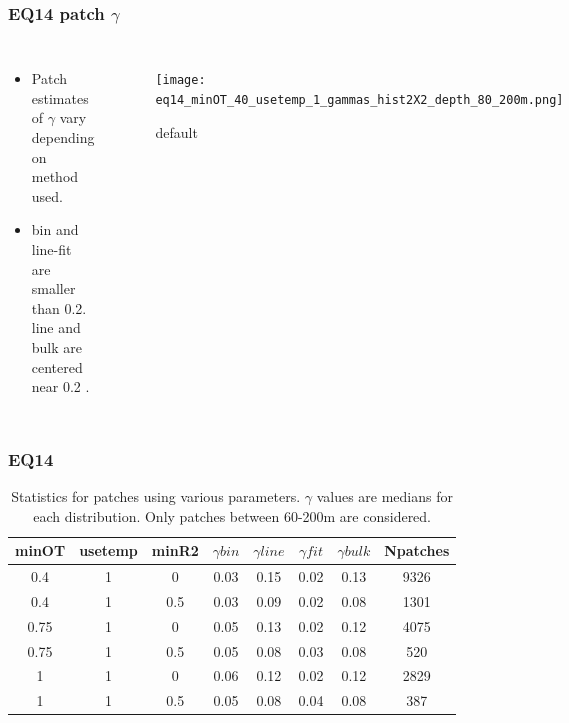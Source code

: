 \documentclass{beamer}
\begin{document}
\begin{frame}
 \frametitle{EQ14 patch $\gamma$}


\begin{columns}
\begin{itemize}
\item Patch estimates of $\gamma$ vary depending on method used.
\item bin and line-fit are smaller than 0.2. line and bulk are centered near 0.2 .
\end{itemize}

\begin{figure}[htbp]
\begin{center}
\texttt{[image: eq14\_minOT\_40\_usetemp\_1\_gammas\_hist2X2\_depth\_80\_200m.png]}
\caption{default}
\label{default}
\end{center}
\end{figure}

\end{columns}



\end{frame}



\begin{frame}
 \frametitle{ EQ14 }

\begin{table}[htdp]
\caption{Statistics for patches using various parameters. $\gamma$ values are medians for each distribution. Only patches between 60-200m are considered.}
\begin{center}
\begin{tabular}{|c|c|c|c|c|c|c|c|}
\hline
minOT & usetemp & minR2 & $\gamma bin$ & $\gamma line$ & $\gamma fit$ & $\gamma bulk$ & Npatches \\
\hline
0.4 & 1 & 0 & 0.03 & 0.15 & 0.02 & 0.13 & 9326 \\
\hline
0.4 & 1 & 0.5 & 0.03 & 0.09 & 0.02 & 0.08 & 1301 \\
\hline
0.75 & 1 & 0 & 0.05 & 0.13 & 0.02 & 0.12 & 4075 \\
\hline
0.75 & 1 & 0.5 & 0.05 & 0.08 & 0.03 & 0.08 & 520 \\
\hline
1 & 1 & 0 & 0.06 & 0.12 & 0.02 & 0.12 & 2829 \\
\hline
1 & 1 & 0.5 & 0.05 & 0.08 & 0.04 & 0.08 & 387 \\
\hline
\hline
\hline
\end{tabular}
\end{center}
\label{tab}
\end{table}%


\end{frame}
\end{document}
